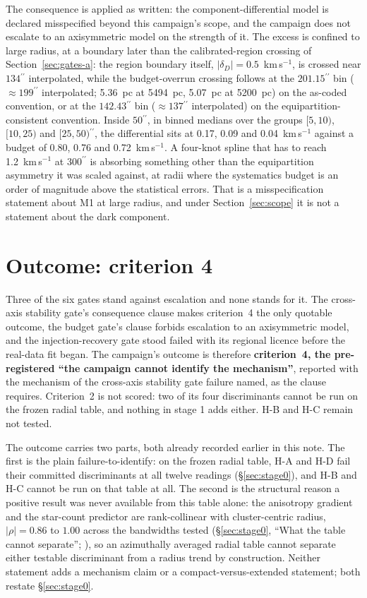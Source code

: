 \documentclass[11pt]{article}
\newcommand{\as}{\ensuremath{^{\prime\prime}}}
\newcommand{\dD}{\ensuremath{\delta_D}}
\begin{document}
The consequence is applied as written: the component-differential model is declared misspecified beyond this campaign's scope, and the campaign does not escalate to an axisymmetric model on the strength of it. The excess is confined to large radius, at a boundary later than the calibrated-region crossing of Section~\ref{sec:gates-a}: the region boundary itself, $|\dD| = 0.5$~km\,s$^{-1}$, is crossed near $134\as$ interpolated, while the budget-overrun crossing follows at the $201.15\as$ bin ($\approx199\as$ interpolated; 5.36~pc at 5494~pc, 5.07~pc at 5200~pc) on the as-coded convention, or at the $142.43\as$ bin ($\approx137\as$ interpolated) on the equipartition-consistent convention. Inside $50\as$, in binned medians over the groups $[5,10)$, $[10,25)$ and $[25,50)\as$, the differential sits at 0.17, 0.09 and 0.04~km\,s$^{-1}$ against a budget of 0.80, 0.76 and 0.72~km\,s$^{-1}$. A four-knot spline that has to reach 1.2~km\,s$^{-1}$ at $300\as$ is absorbing something other than the equipartition asymmetry it was scaled against, at radii where the systematics budget is an order of magnitude above the statistical errors. That is a misspecification statement about M1 at large radius, and under Section~\ref{sec:scope} it is not a statement about the dark component.

\section{Outcome: criterion 4}
\label{sec:outcome}

Three of the six gates stand against escalation and none stands for it. The cross-axis stability gate's consequence clause makes criterion~4 the only quotable outcome, the budget gate's clause forbids escalation to an axisymmetric model, and the injection-recovery gate stood failed with its regional licence before the real-data fit began. The campaign's outcome is therefore \textbf{criterion~4, the pre-registered ``the campaign cannot identify the mechanism''}, reported with the mechanism of the cross-axis stability gate failure named, as the clause requires. Criterion~2 is not scored: two of its four discriminants cannot be run on the frozen radial table, and nothing in stage 1 adds either. H-B and H-C remain not tested.

The outcome carries two parts, both already recorded earlier in this note. The first is the plain failure-to-identify: on the frozen radial table, H-A and H-D fail their committed discriminants at all twelve readings (\S\ref{sec:stage0}), and H-B and H-C cannot be run on that table at all. The second is the structural reason a positive result was never available from this table alone: the anisotropy gradient and the star-count predictor are rank-collinear with cluster-centric radius, $|\rho| = 0.86$ to $1.00$ across the bandwidths tested (\S\ref{sec:stage0}, ``What the table cannot separate''; \citep{AXIStage0Report2026}), so an azimuthally averaged radial table cannot separate either testable discriminant from a radius trend by construction. Neither statement adds a mechanism claim or a compact-versus-extended statement; both restate \S\ref{sec:stage0}.
\end{document}
